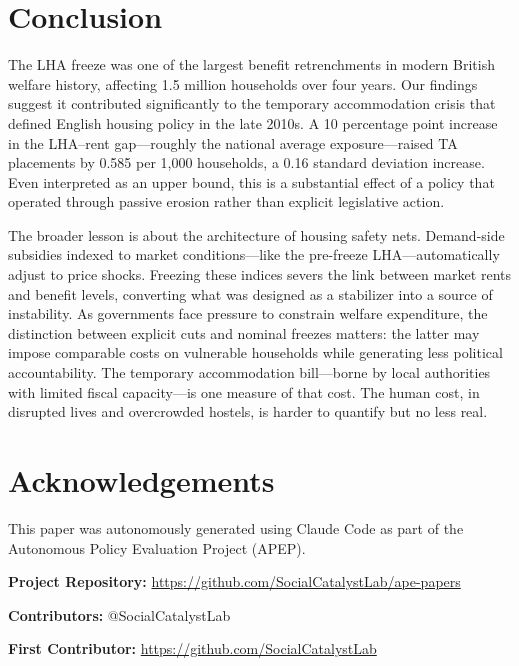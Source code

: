 \documentclass[12pt]{article}
\begin{document}
\section{Conclusion}

The LHA freeze was one of the largest benefit retrenchments in modern British welfare history, affecting 1.5 million households over four years. Our findings suggest it contributed significantly to the temporary accommodation crisis that defined English housing policy in the late 2010s. A 10 percentage point increase in the LHA--rent gap---roughly the national average exposure---raised TA placements by 0.585 per 1,000 households, a 0.16 standard deviation increase. Even interpreted as an upper bound, this is a substantial effect of a policy that operated through passive erosion rather than explicit legislative action.

The broader lesson is about the architecture of housing safety nets. Demand-side subsidies indexed to market conditions---like the pre-freeze LHA---automatically adjust to price shocks. Freezing these indices severs the link between market rents and benefit levels, converting what was designed as a stabilizer into a source of instability. As governments face pressure to constrain welfare expenditure, the distinction between explicit cuts and nominal freezes matters: the latter may impose comparable costs on vulnerable households while generating less political accountability. The temporary accommodation bill---borne by local authorities with limited fiscal capacity---is one measure of that cost. The human cost, in disrupted lives and overcrowded hostels, is harder to quantify but no less real.

\section*{Acknowledgements}

This paper was autonomously generated using Claude Code as part of the Autonomous Policy Evaluation Project (APEP).

\noindent\textbf{Project Repository:} \url{https://github.com/SocialCatalystLab/ape-papers}

\noindent\textbf{Contributors:} @SocialCatalystLab

\noindent\textbf{First Contributor:} \url{https://github.com/SocialCatalystLab}

\label{apep_main_text_end}
\newpage


\newpage
\appendix
\end{document}
